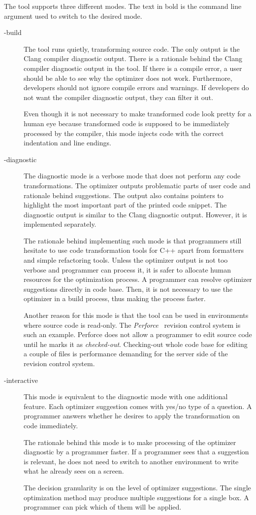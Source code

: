 The tool supports three different modes. The text in bold is the command line argument used to switch to the desired mode.
\begin{description}
\item[-build]{
The tool runs quietly, transforming source code. The only output is the Clang compiler diagnostic output. There is a rationale behind the Clang compiler diagnostic output in the tool. If there is a compile error, a user should be able to see why the optimizer does not work. Furthermore, developers should not ignore compile errors and warnings. If developers do not want the compiler diagnostic output, they can filter it out.

Even though it is not necessary to make transformed code look pretty for a human eye because transformed code is supposed to be immediately processed by the compiler, this mode injects code with the correct indentation and line endings.
}
\item[-diagnostic]{
The diagnostic mode is a verbose mode that does not perform any code transformations. The optimizer outputs problematic parts of user code and rationale behind suggestions. The output also contains pointers to highlight the most important part of the printed code snippet. The diagnostic output is similar to the Clang diagnostic output. However, it is implemented separately.

The rationale behind implementing such mode is that programmers still hesitate to use code transformation tools for C++ apart from formatters and simple refactoring tools. Unless the optimizer output is not too verbose and programmer can process it, it is safer to allocate human resources for the optimization process. A programmer can resolve optimizer suggestions directly in code base. Then, it is not necessary to use the optimizer in a build process, thus making the process faster.

Another reason for this mode is that the tool can be used in environments where source code is read-only. The \emph{Perforce}~\cite{perforce} revision control system is such an example. Perforce does not allow a programmer to edit source code until he marks it as \emph{checked-out}. Checking-out whole code base for editing a couple of files is performance demanding for the server side of the revision control system.
}
\item[-interactive]{
This mode is equivalent to the diagnostic mode with one additional feature. Each optimizer suggestion comes with yes/no type of a question. A programmer answers whether he desires to apply the transformation on code immediately.

The rationale behind this mode is to make processing of the optimizer diagnostic by a programmer faster. If a programmer sees that a suggestion is relevant, he does not need to switch to another environment to write what he already sees on a screen.

The decision granularity is on the level of optimizer suggestions. The single optimization method may produce multiple suggestions for a single box. A programmer can pick which of them will be applied.
}
\end{description}

